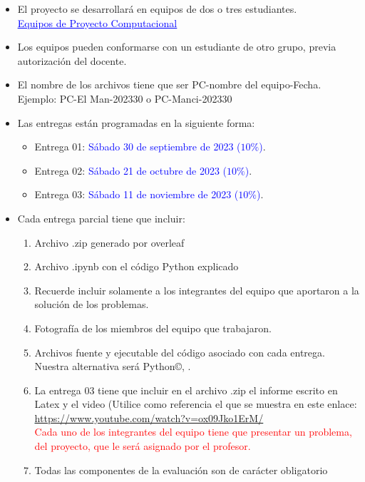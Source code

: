 \documentclass[12pt]{paper}
\begin{document}
\begin{center}
\end{center}

\begin{flushleft}
\end{flushleft}

\begin{itemize}
    \item El proyecto se desarrollará en equipos de dos o tres estudiantes.\\
    \href{https://uninorte-my.sharepoint.com/:x:/g/personal/amancill_uninorte_edu_co/EXJdAWT05URDotm1cGbX-akBEPnM2c9Az_xDnexHUJNuZg?e=XOFwYp}{\textcolor{blue}{\underline{Equipos de Proyecto Computacional}}}


    \item Los equipos pueden conformarse con un estudiante de otro grupo, previa autorización del docente.
    \item El nombre de los archivos tiene que ser PC-nombre del equipo-Fecha. Ejemplo: PC-El Man-202330 o PC-Manci-202330
    \item Las entregas están programadas en la siguiente forma:
    \begin{itemize}
        \item Entrega 01: \textcolor{blue}{Sábado 30 de septiembre de 2023 ($10\%$)}.  
        \item Entrega 02: \textcolor{blue}{Sábado 21 de octubre de 2023 ($10\%$)}. 
        \item Entrega 03: \textcolor{blue}{Sábado 11 de noviembre de 2023 ($10\%$)}.
    \end{itemize}
    \item Cada entrega parcial tiene que incluir:
    \begin{enumerate}

        \item Archivo .zip generado por overleaf 
        \item Archivo .ipynb con el código Python explicado
        \item Recuerde incluir solamente a los integrantes del equipo que aportaron a la solución de los problemas.
        \item Fotografía de los miembros del equipo que trabajaron.
        \item Archivos fuente y ejecutable del código asociado con cada entrega. Nuestra alternativa será Python\copyright, .
        \item La entrega 03 tiene que incluir en el archivo .zip el informe escrito en Latex y el video (Utilice como referencia el que se muestra en este enlace:\\
        \textcolor{cyan}{\underline{\url{https://www.youtube.com/watch?v=ox09Jko1ErM/}}} \\
        \textcolor{red}{Cada uno de los integrantes del equipo tiene que presentar un problema, del proyecto, que le será asignado por el profesor.}
        \item Todas las componentes de la evaluación son de carácter obligatorio
    \end{enumerate}
\end{itemize}
\end{document}
